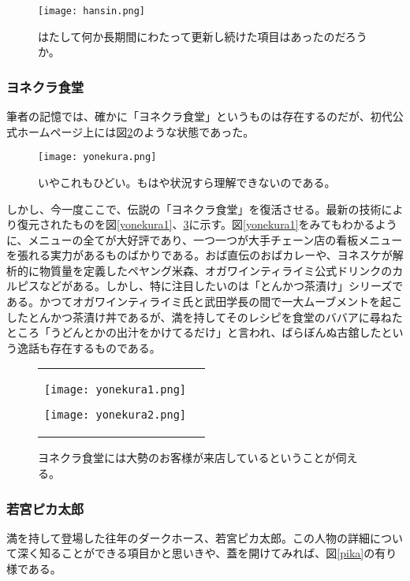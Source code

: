 \begin{figure}[H]
  \centering
  \texttt{[image: hansin.png]}
  \caption{はたして何か長期間にわたって更新し続けた項目はあったのだろうか。}
\label{hansin}
\end{figure}

\subsubsection{ヨネクラ食堂}
筆者の記憶では、確かに「ヨネクラ食堂」というものは存在するのだが、初代公式ホームページ上には図\ref{yonekura}のような状態であった。

\begin{figure}[H]
  \centering
  \texttt{[image: yonekura.png]}
  \caption{いやこれもひどい。もはや状況すら理解できないのである。}
\label{yonekura}
\end{figure}

しかし、今一度ここで、伝説の「ヨネクラ食堂」を復活させる。最新の技術により復元されたものを図\ref{yonekura1}、\ref{yonekura2}に示す。図\ref{yonekura1}をみてもわかるように、メニューの全てが大好評であり、一つ一つが大手チェーン店の看板メニューを張れる実力があるものばかりである。おば直伝のおばカレーや、ヨネスケが解析的に物質量を定義したペヤング米森、オガワインティライミ公式ドリンクのカルピスなどがある。しかし、特に注目したいのは「とんかつ茶漬け」シリーズである。かつてオガワインティライミ氏と武田学長の間で一大ムーブメントを起こしたとんかつ茶漬け丼であるが、満を持してそのレシピを食堂のババアに尋ねたところ「うどんとかの出汁をかけてるだけ」と言われ、ばらぼんぬ古舘したという逸話も存在するものである。

\begin{figure}[H]
\centering
\begin{tabular}{cc}
\begin{minipage}{0.4\hsize}
\texttt{[image: yonekura1.png]}
\caption{時価という概念}
\label{yonekura1}
\end{minipage}

\begin{minipage}{0.4\hsize}
\texttt{[image: yonekura2.png]}
\caption{ヨネクラ食堂には大勢のお客様が来店しているということが伺える。}
\label{yonekura2}
\end{minipage}
\end{tabular}
\end{figure}

\subsubsection{若宮ピカ太郎}
満を持して登場した往年のダークホース、若宮ピカ太郎。この人物の詳細について深く知ることができる項目かと思いきや、蓋を開けてみれば、図\ref{pika}の有り様である。

